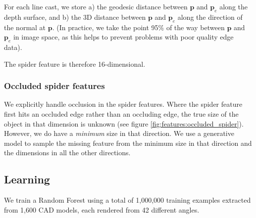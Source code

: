 \documentclass[10pt,twocolumn,letterpaper]{article}
\newcommand{\point}{\mathbf{p}}
\begin{document}
For each line cast, we store 
a) the geodesic distance between $\point$ and $\point_{e}$ along the depth surface, and 
b) the 3D distance between $\point$ and $\point_{e}$ along the direction of the normal at $\point$. (In practice, we take the point 95\% of the way between $\point$ and $\point_{e}$ in image space, as this helps to prevent problems with poor quality edge data).

The spider feature is therefore 16-dimensional.

\subsubsection{Occluded spider features}

We explicitly handle occlusion in the spider features. Where the spider feature first hits an occluded edge rather than an occluding edge, the true size of the object in that dimension is unknown (see figure \ref{fig:features:occluded_spider}).
However, we do have a \textit{minimum} size in that direction.
We use a generative model to sample the missing feature from the minimum size in that direction and the dimensions in all the other directions.







\subsection{Learning}

We train a Random Forest using a total of 1,000,000 training examples extracted from 1,600 CAD models, each rendered from 42 different angles.
\end{document}
